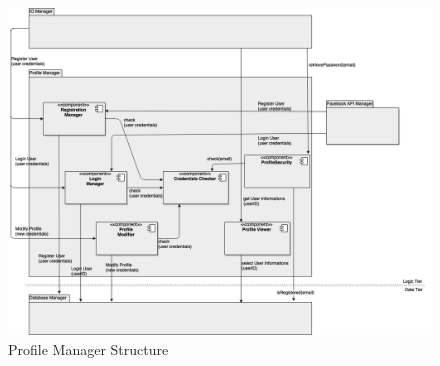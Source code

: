 \documentclass[../../../../../../../dd.tex]{subfiles}
\begin{document}
		\begin{figure}[H]
				\centering
				\includegraphics[width=\textwidth, scale=0.5]{../images/ProfileManager.png}
			\caption{Profile Manager Structure}\label{fig:ProfileManager}
		\end{figure}
		
\end{document}
